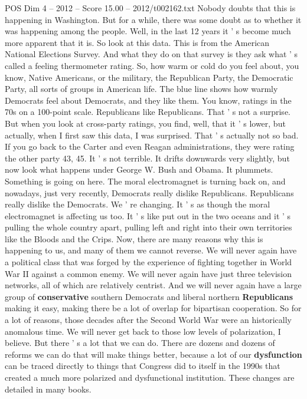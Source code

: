 \begin{textsample}{POS Dim 4 – 2012 – Score 15.00 – 2012/t002162.txt}
Nobody doubts that this is happening in Washington.
But for a while, there was some doubt as to whether it was happening among the people.
Well, in the last 12 years it ' s become much more apparent that it is.
So look at this data.
This is from the American National Elections Survey.
And what they do on that survey is they ask what ' s called a feeling thermometer rating.
So, how warm or cold do you feel about, you know, Native Americans, or the military, the Republican Party, the Democratic Party, all sorts of groups in American life.
The blue line shows how warmly Democrats feel about Democrats, and they like them.
You know, ratings in the 70s on a 100-point scale.
Republicans like Republicans.
That ' s not a surprise.
But when you look at cross-party ratings, you find, well, that it ' s lower, but actually, when I first saw this data, I was surprised.
That ' s actually not so bad.
If you go back to the Carter and even Reagan administrations, they were rating the other party 43, 45.
It ' s not terrible.
It drifts downwards very slightly, but now look what happens under George W.
Bush and Obama.
It plummets.
Something is going on here.
The moral electromagnet is turning back on, and nowadays, just very recently, Democrats really dislike Republicans.
Republicans really dislike the Democrats.
We ' re changing.
It ' s as though the moral electromagnet is affecting us too.
It ' s like put out in the two oceans and it ' s pulling the whole country apart, pulling left and right into their own territories like the Bloods and the Crips.
Now, there are many reasons why this is happening to us, and many of them we cannot reverse.
We will never again have a political class that was forged by the experience of fighting together in World War II against a common enemy.
We will never again have just three television networks, all of which are relatively centrist.
And we will never again have a large group of \textbf{conservative} southern Democrats and liberal northern \textbf{Republicans} making it easy, making there be a lot of overlap for bipartisan cooperation.
So for a lot of reasons, those decades after the Second World War were an historically anomalous time.
We will never get back to those low levels of polarization, I believe.
But there ' s a lot that we can do.
There are dozens and dozens of reforms we can do that will make things better, because a lot of our \textbf{dysfunction} can be traced directly to things that Congress did to itself in the 1990s that created a much more polarized and dysfunctional institution.
These changes are detailed in many books.

\end{textsample}
